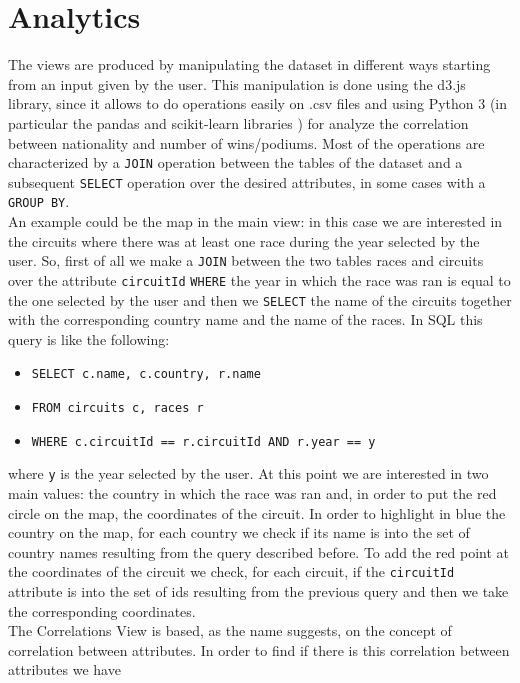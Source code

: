 \documentclass[11pt,twocolumn,letterpaper]{article}
\begin{document}
\section{Analytics}
The views are produced by manipulating the dataset in different ways starting from an input given by the user. This manipulation is done using the d3.js \cite{D3} library,
since it allows to do operations easily on .csv files and using Python 3 (in particular the pandas \cite{Pandas} and scikit-learn libraries \cite{Scikit-learn}) 
for analyze the correlation between nationality and number of wins/podiums. Most of the operations are characterized by a \texttt{JOIN} operation between the tables of the 
dataset and a subsequent \texttt{SELECT} operation over the desired attributes, in some cases with a \texttt{GROUP BY}.\\
An example could be the map in the main view: in this case we are interested in the circuits where there was at least one race during the year selected by the user. So, first
of all we make a \texttt{JOIN} between the two tables races and circuits over the attribute \texttt{circuitId} \texttt{WHERE} the year in which the race was ran is equal to the
one selected by the user and then we \texttt{SELECT} the name of the circuits together with the corresponding country name and the name of the races. In SQL this query is like the
following:
\begin{itemize}
	\item \texttt{SELECT c.name, c.country, r.name}
	\item \texttt{FROM circuits c, races r}
	\item \texttt{WHERE c.circuitId == r.circuitId AND r.year == y}
\end{itemize}
where \texttt{y} is the year selected by the user.
At this point we are interested in two main values: the country in which the race was ran and, in order to put the red circle on the map, the coordinates of the circuit. In order to
highlight in blue the country on the map, for each country we check if its name is into the set of country names resulting from the query described before. To add the red point
at the coordinates of the circuit we check, for each circuit, if the \texttt{circuitId} attribute is into the set of ids resulting from the previous query and then we take the
corresponding coordinates.\\
The Correlations View is based, as the name suggests, on the concept of correlation between attributes. In order to find if there is this correlation between attributes we have
\end{document}
